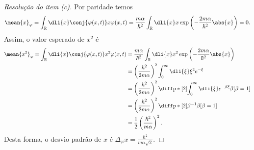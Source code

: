 \begin{proof}[Resolução do item (c)]
    Por paridade temos
    \begin{equation*}
        \mean{x}_{\varphi} = \int_{\mathbb{R}}\dli{x} \conj{\varphi(x,t)} x \varphi(x, t) = \frac{m \alpha}{\hbar^2}\int_{\mathbb{R}} \dli{x} x \exp{\left(-\frac{2m \alpha}{\hbar^2}\abs{x}\right)} = 0.
    \end{equation*}
    Assim, o valor esperado de \(x^2\) é
    \begin{align*}
        \mean{x^2}_{\varphi} = \int_{\mathbb{R}} \dli{x} \conj{\varphi(x,t)} x^2\varphi(x,t)
        &= \frac{m \alpha}{\hbar^2} \int_{\mathbb{R}} \dli{x} x^2 \exp{\left(-\frac{2m \alpha}{\hbar^2}\abs{x}\right)}\\
        &= \left(\frac{\hbar^2}{2m\alpha}\right)^2 \int_0^\infty \dli{\xi} \xi^2e^{-\xi}\\
        &= \left(\frac{\hbar^2}{2m\alpha}\right)^2 \diffp*[2]{\int_0^\infty\dli{\xi} e^{-\beta\xi}}{\beta}[\beta = 1]\\
        &= \left(\frac{\hbar^2}{2m\alpha}\right)^2 \diffp*[2]{\beta^{-1}}{\beta}[\beta = 1]\\
        &= \frac12\left(\frac{\hbar^2}{m\alpha}\right)^2.
    \end{align*}
    Desta forma, o desvio padrão de \(x\) é \(\Delta_\varphi x = \frac{\hbar^2}{m \alpha\sqrt{2}}\).
\end{proof}

